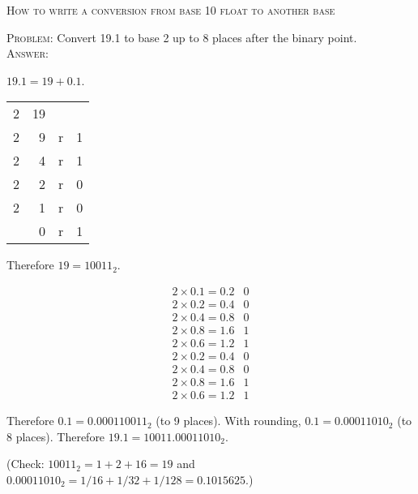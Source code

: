 \textsc{How to write a conversion from base 10 float to another base}

\textsc{Problem:}
Convert 19.1 to base 2 up to 8 places after the binary point.
\\
\textsc{Answer:}\vspace{-2mm}
\begin{answerlong}
  $19.1 = 19 + 0.1$.
  
\begin{longtable}{r|rrr}
  2 & 19 &   &   \\ \cline{2-4}
  2 &  9 & r & 1 \\ \cline{2-4}
  2 &  4 & r & 1 \\ \cline{2-4}
  2 &  2 & r & 0 \\ \cline{2-4}
  2 &  1 & r & 0 \\ \cline{2-4}
    &  0 & r & 1 \\ \cline{2-4}
\end{longtable}
Therefore $19 = 10011_{2}$.

\begin{align*}
  2 \times 0.1 = 0.2 & 0 \\
  2 \times 0.2 = 0.4 & 0 \\
  2 \times 0.4 = 0.8 & 0 \\
  2 \times 0.8 = 1.6 & 1 \\
  2 \times 0.6 = 1.2 & 1 \\
  2 \times 0.2 = 0.4 & 0 \\
  2 \times 0.4 = 0.8 & 0 \\
  2 \times 0.8 = 1.6 & 1 \\
  2 \times 0.6 = 1.2 & 1 
\end{align*}

Therefore $0.1 = 0.000110011_2$ (to 9 places).
With rounding, $0.1 = 0.00011010_2$ (to 8 places).
Therefore $19.1 = 10011.00011010_2$.

(Check:
$10011_2 = 1 + 2 + 16 = 19$
and
$0.00011010_2 = 1/16 + 1/32 + 1/128 = 0.1015625$.)
\end{answerlong}
